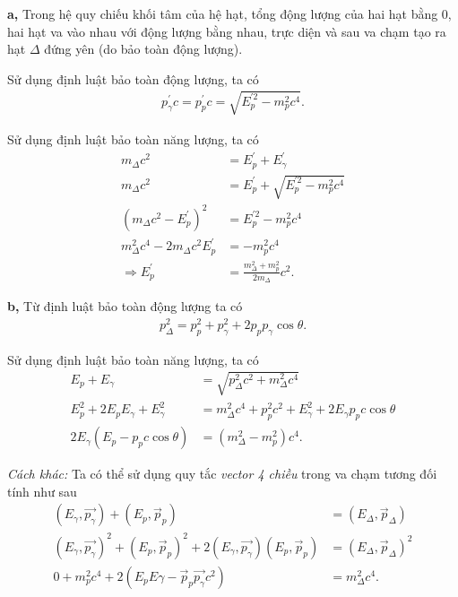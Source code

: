 \textbf{a,} Trong hệ quy chiếu khối tâm của hệ hạt, tổng động lượng của hai hạt bằng 0, hai hạt va vào nhau với động lượng bằng nhau, trực diện và sau va chạm tạo ra hạt $\Delta$ đứng yên (do bảo toàn động lượng).

Sử dụng định luật bảo toàn động lượng, ta có
\begin{align}
    p^\prime_\gamma c= p^\prime_p c = \sqrt{E^{\prime 2}_p - m_p^2 c^4}. 
\end{align}

Sử dụng định luật bảo toàn năng lượng, ta có 
\begin{align}
  m_\Delta c^2   &=  E^{\prime}_p + E^\prime_\gamma\\
   m_\Delta c^2   &=E^{\prime}_p +  \sqrt{E^{\prime 2}_p - m_p^2 c^4}\\
   (  m_\Delta c^2  - E^{\prime}_p )^2 &= E^{\prime 2}_p - m_p^2 c^4\\
   m_\Delta^2 c^4 - 2m_\Delta c^2 E^{\prime}_p & = - m_p^2 c^4\\
   \Rightarrow E^\prime_p &= \frac{m_\Delta^2 + m_p^2}{2 m_\Delta} c^2. \label{50}
\end{align}

\textbf{b,} Từ định luật bảo toàn động lượng ta có
\begin{align}
    p_\Delta^2 = p_p^2 + p_\gamma^2 + 2p_p p_\gamma \cos \theta.
\end{align}

Sử dụng định luật bảo toàn năng lượng, ta có
\begin{align}
    E_p + E_\gamma &= \sqrt{p_\Delta^2 c^2 + m_\Delta^2 c^4}\\
    E_p^2 + 2 E_p E_\gamma + E_\gamma^2 &= m_\Delta^2 c^4 + p^2_p c^2 + E_\gamma^2 + 2 E_\gamma p_p c \cos \theta\\
    2 E_\gamma (E_p - p_p c \cos \theta)&= (m_\Delta^2 - m_p^2) c^4. \label{51}
\end{align}

\textit{Cách khác:} Ta có thể sử dụng quy tắc \textit{vector 4 chiều} trong va chạm tương đối tính như sau
\begin{align}
    (E_\gamma, \vec{p_\gamma}) + (E_p, \vec{p}_p) &= (E_\Delta,\vec{p}_\Delta)\\
    (E_\gamma, \vec{p_\gamma})^2 + (E_p, \vec{p}_p)^2 + 2(E_\gamma, \vec{p_\gamma})(E_p, \vec{p}_p)&=(E_\Delta, \vec{p}_\Delta)^2\\
    0 + m_p^2 c^4 + 2(E_p E\gamma - \vec{p}_p \vec{p_\gamma} c^2 )&= m_\Delta^2 c^4.
\end{align}

